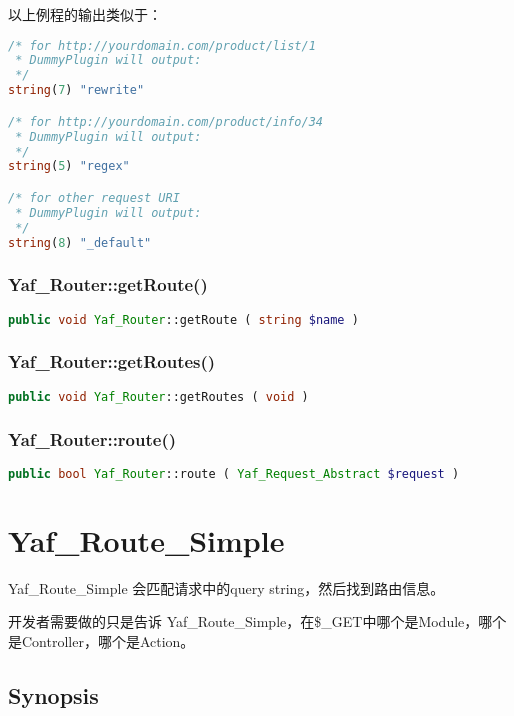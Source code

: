 以上例程的输出类似于：

\begin{lstlisting}[language=PHP]
/* for http://yourdomain.com/product/list/1
 * DummyPlugin will output:
 */
string(7) "rewrite"

/* for http://yourdomain.com/product/info/34
 * DummyPlugin will output:
 */
string(5) "regex"

/* for other request URI
 * DummyPlugin will output:
 */
string(8) "_default"
\end{lstlisting}

\subsection{Yaf\_Router::getRoute()}


\begin{lstlisting}[language=PHP]
public void Yaf_Router::getRoute ( string $name )
\end{lstlisting}


\subsection{Yaf\_Router::getRoutes()}



\begin{lstlisting}[language=PHP]
public void Yaf_Router::getRoutes ( void )
\end{lstlisting}

\subsection{Yaf\_Router::route()}


\begin{lstlisting}[language=PHP]
public bool Yaf_Router::route ( Yaf_Request_Abstract $request )
\end{lstlisting}


\chapter{Yaf\_Route\_Simple}


Yaf\_Route\_Simple 会匹配请求中的query string，然后找到路由信息。

开发者需要做的只是告诉 Yaf\_Route\_Simple，在\$\_GET中哪个是Module，哪个是Controller，哪个是Action。


\section{Synopsis}

